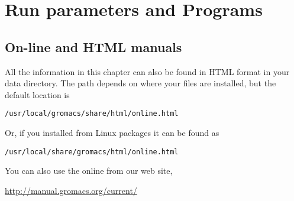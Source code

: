 %
%
%
%
%
%

\chapter{Run parameters and Programs}
\label{ch:programs}

\section{On-line and HTML manuals}
All the information in this chapter can also be found in HTML
format in your {\gromacs} data directory. The path depends on
where your files are installed, but the default location is \\
\centerline{\tt /usr/local/gromacs/share/html/online.html}
Or, if you installed from Linux packages it can be found as\\
\centerline{\tt /usr/local/share/gromacs/html/online.html}
You can also use the online from our web site,\\
\centerline{\href{http://manual.gromacs.org/current/}{http://manual.gromacs.org/current/}}

